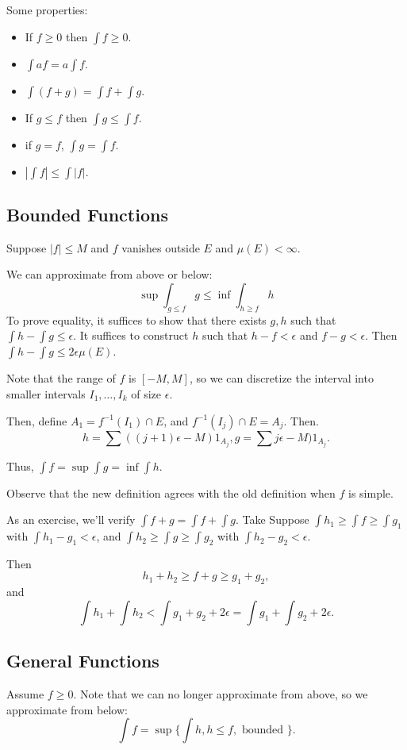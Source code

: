 \documentclass[11pt]{scrartcl}
\begin{document}
Some properties:
\begin{itemize}
\item If $f \ge 0$ then $\int f \ge 0$.
\item $\int af = a \int f$.
\item $\int (f+g) = \int f + \int g$.
\item If $g \le f$ then $\int g \le \int f$.
\item if $g = f$, $\int g = \int f$.
\item $|\int f| \le \int |f|.$ 
\end{itemize}
\subsection{Bounded Functions}
Suppose $|f| \le M$ and $f$ vanishes outside $E$ and $\mu(E) < \infty$.

We can approximate from above or below:
$$\sup \int_{g \le f} g \le \inf \int_{h \ge f} h$$
To prove equality, it suffices to show that there exists $g, h$ such that $\int h - \int g \le \epsilon$.  It suffices to construct $h$ such that $h-f < \epsilon$ and $f-g < \epsilon$.  Then $\int h - \int g \le 2 \epsilon \mu(E)$.

Note that the range of $f$ is $[-M, M]$, so we can discretize the interval into smaller intervals $I_1, \dots, I_k$ of size $\epsilon$.   

Then, define $A_1 = f^{-1}(I_1) \cap E$, and $f^{-1}(I_j) \cap E = A_j$.  Then.
 $$h = \sum ((j+1) \epsilon - M) 1_{A_j}, g = \sum j\epsilon - M)1_{A_j}.$$
 
 Thus, $\int f = \sup \int g = \inf \int h.$
 
 Observe that the new definition agrees with the old definition when $f$ is simple.
 
 As an exercise, we'll verify $\int f+g = \int f + \int g$.  Take Suppose $\int h_1 \ge \int f \ge \int g_1$ with $\int h_1 - g_1 < \epsilon$, and $\int h_2 \ge \int g \ge \int g_2$ with $\int h_2 - g_2 < \epsilon$.
 
 Then
 $$h_1 + h_2 \ge f+g \ge g_1 + g_2,$$
 and $$\int h_1 + \int h_2 < \int g_1 + g_2 + 2\epsilon = \int g_1 + \int g_2 + 2\epsilon.$$
 \subsection{General Functions}
 Assume $f \ge 0$.  Note that we can no longer approximate from above, so we approximate from below:
 $$\int f = \sup\{\int h, h \le f, \text{ bounded }\}.$$
 
\end{document}

